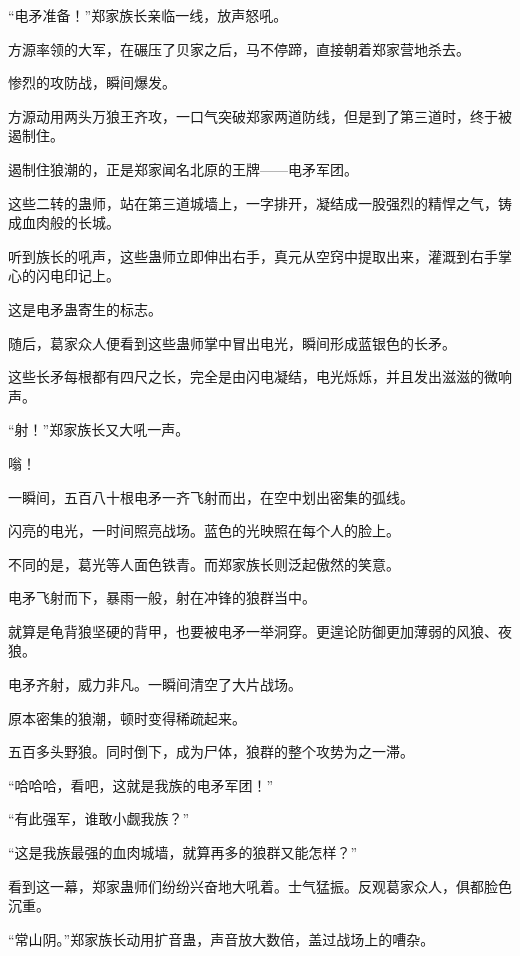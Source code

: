 
\begin{this_body}

“电矛准备！”郑家族长亲临一线，放声怒吼。

方源率领的大军，在碾压了贝家之后，马不停蹄，直接朝着郑家营地杀去。

惨烈的攻防战，瞬间爆发。

方源动用两头万狼王齐攻，一口气突破郑家两道防线，但是到了第三道时，终于被遏制住。

遏制住狼潮的，正是郑家闻名北原的王牌——电矛军团。

这些二转的蛊师，站在第三道城墙上，一字排开，凝结成一股强烈的精悍之气，铸成血肉般的长城。

听到族长的吼声，这些蛊师立即伸出右手，真元从空窍中提取出来，灌溉到右手掌心的闪电印记上。

这是电矛蛊寄生的标志。

随后，葛家众人便看到这些蛊师掌中冒出电光，瞬间形成蓝银色的长矛。

这些长矛每根都有四尺之长，完全是由闪电凝结，电光烁烁，并且发出滋滋的微响声。

“射！”郑家族长又大吼一声。

嗡！

一瞬间，五百八十根电矛一齐飞射而出，在空中划出密集的弧线。

闪亮的电光，一时间照亮战场。蓝色的光映照在每个人的脸上。

不同的是，葛光等人面色铁青。而郑家族长则泛起傲然的笑意。

电矛飞射而下，暴雨一般，射在冲锋的狼群当中。

就算是龟背狼坚硬的背甲，也要被电矛一举洞穿。更遑论防御更加薄弱的风狼、夜狼。

电矛齐射，威力非凡。一瞬间清空了大片战场。

原本密集的狼潮，顿时变得稀疏起来。

五百多头野狼。同时倒下，成为尸体，狼群的整个攻势为之一滞。

“哈哈哈，看吧，这就是我族的电矛军团！”

“有此强军，谁敢小觑我族？”

“这是我族最强的血肉城墙，就算再多的狼群又能怎样？”

看到这一幕，郑家蛊师们纷纷兴奋地大吼着。士气猛振。反观葛家众人，俱都脸色沉重。

“常山阴。”郑家族长动用扩音蛊，声音放大数倍，盖过战场上的嘈杂。


\end{this_body}
